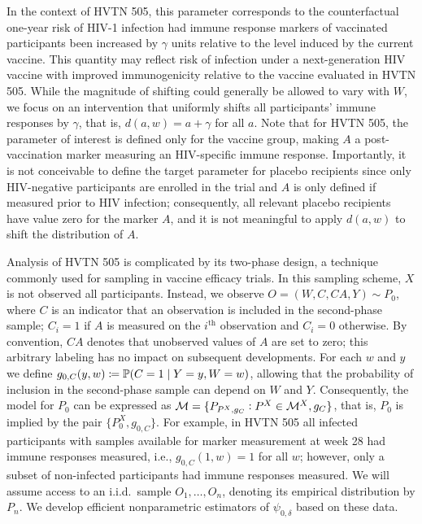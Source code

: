 
In the context of HVTN 505, this parameter corresponds to the counterfactual
one-year risk of HIV-1 infection had immune response markers of vaccinated
participants been increased by $\gamma$ units relative to the level induced by
the current vaccine. This quantity may reflect risk of infection under
a next-generation HIV vaccine with improved immunogenicity relative to the
vaccine evaluated in HVTN 505. While the magnitude of shifting could generally
be allowed to vary with $W$, we focus on an intervention that uniformly shifts
all participants' immune responses by $\gamma$, that is, $d(a,w) = a + \gamma$
for all $a$. Note that for HVTN 505, the parameter of interest is defined only
for the vaccine group, making $A$ a post-vaccination marker measuring an
HIV-specific immune response. Importantly, it is not conceivable to define the
target parameter for placebo recipients since only HIV-negative participants are
enrolled in the trial and $A$ is only defined if measured prior to HIV
infection; consequently, all relevant placebo recipients have value zero for the
marker $A$, and it is not meaningful to apply $d(a,w)$ to shift the distribution
of $A$.

Analysis of HVTN 505 is complicated by its two-phase design, a technique
commonly used for sampling in vaccine efficacy trials. In this sampling scheme,
$X$ is not observed all participants. Instead, we observe $O = (W, C, C A, Y)
\sim P_0$, where $C$ is an indicator that an observation is included in the
second-phase sample; $C_i = 1$ if $A$ is measured on the $i^{\text{th}}$
observation and $C_i = 0$ otherwise. By convention, $C A$ denotes that
unobserved values of $A$ are set to zero; this arbitrary labeling has no impact
on subsequent developments. For each $w$ and $y$ we define $g_{0, C}(y, w)
\coloneqq \mathbb{P}(C = 1 \mid Y = y, W = w)$, allowing that the probability of
inclusion in the second-phase sample can depend on $W$ and $Y$. Consequently,
the model for $P_0$ can be expressed as $\mathcal{M} = \{P_{P^X, g_C}: P^X \in \mathcal{M}^X,
g_C\}$, that is, $P_0$ is implied by the pair $\{P^X_0, g_{0, C}\}$. For
example, in HVTN 505 all infected participants with samples available for marker
measurement at week 28 had immune responses measured, i.e., $g_{0,C}(1,w) = 1$
for all $w$; however, only a subset of non-infected participants had immune
responses measured. We will assume access to an i.i.d.~sample $O_1, \ldots,
O_n$, denoting its empirical distribution by $P_n$. We develop efficient
nonparametric estimators of $\psi_{0,\delta}$ based on these data.

